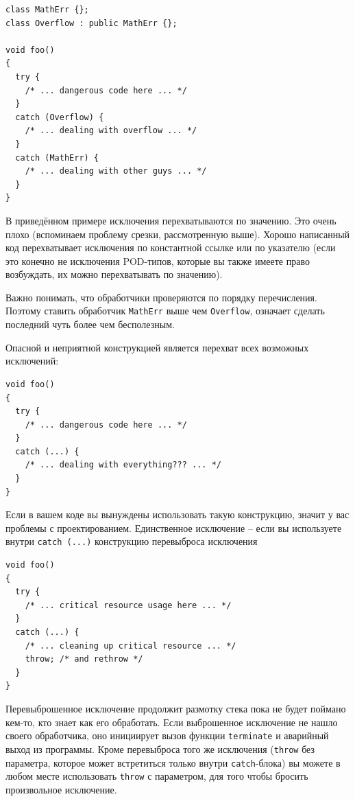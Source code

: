 \documentclass[a4paper,12pt,oneside]{article}
\begin{document}
\begin{lstlisting}
class MathErr {};
class Overflow : public MathErr {};

void foo()
{
  try {
    /* ... dangerous code here ... */
  }
  catch (Overflow) {
    /* ... dealing with overflow ... */
  }
  catch (MathErr) {
    /* ... dealing with other guys ... */
  }
}

\end{lstlisting}

В приведённом примере исключения перехватываются по значению. Это очень плохо (вспоминаем проблему срезки, рассмотренную выше). Хорошо написанный код перехватывает исключения по константной ссылке или по указателю (если это конечно не исключения POD-типов, которые вы также имеете право возбуждать, их можно перехватывать по значению).

Важно понимать, что обработчики проверяются по порядку перечисления. Поэтому ставить обработчик \lstinline!MathErr! выше чем \lstinline!Overflow!, означает сделать последний чуть более чем бесполезным.

Опасной и неприятной конструкцией является перехват всех возможных исключений:

\begin{lstlisting}
void foo()
{
  try {
    /* ... dangerous code here ... */
  }
  catch (...) {
    /* ... dealing with everything??? ... */
  }
}
\end{lstlisting}

Если в вашем коде вы вынуждены использовать такую конструкцию, значит у вас проблемы с проектированием. Единственное исключение -- если вы используете внутри \lstinline!catch (...)! конструкцию перевыброса исключения

\begin{lstlisting}
void foo()
{
  try {
    /* ... critical resource usage here ... */
  }
  catch (...) {
    /* ... cleaning up critical resource ... */
    throw; /* and rethrow */
  }
}
\end{lstlisting}

Перевыброшенное исключение продолжит размотку стека пока не будет поймано кем-то, кто знает как его обработать. Если выброшенное исключение не нашло своего обработчика, оно инициирует вызов функции \lstinline!terminate! и аварийный выход из программы. Кроме перевыброса того же исключения (\lstinline!throw! без параметра, которое может встретиться только внутри \lstinline!catch!-блока) вы можете в любом месте использовать \lstinline!throw! с параметром, для того чтобы бросить произвольное исключение. 
\end{document}
